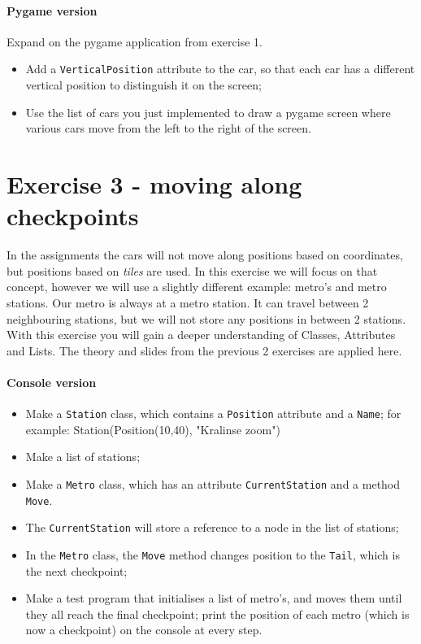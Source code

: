 \documentclass[12pt,a4paper]{article}
\begin{document}
		\paragraph*{Pygame version}
		    Expand on the pygame application from exercise 1.

			\begin{itemize}
				\item Add a \texttt{VerticalPosition} attribute to the car, so that each car has a different vertical position to distinguish it on the screen;
				\item Use the list of cars you just implemented to draw a pygame screen where various cars move from the left to the right of the screen.
			\end{itemize}

	\section{Exercise 3 - moving along checkpoints}
	    In the assignments the cars will not move along positions based on coordinates, but positions based on \textit{tiles} are used.
	    In this exercise we will focus on that concept, however we will use a slightly different example: metro's and metro stations.
	    Our metro is always at a metro station. It can travel between 2 neighbouring stations, but we will not store any positions in between 2 stations.
        With this exercise you will gain a deeper understanding of Classes, Attributes and Lists.
        The theory and slides from the previous 2 exercises are applied here.

		\paragraph*{Console version}
			\begin{itemize}
				\item Make a \texttt{Station} class,
                        which contains a \texttt{Position} attribute and a \texttt{Name};
                        for example: Station(Position(10,40), "Kralinse zoom")
				\item Make a list of stations;
				\item Make a \texttt{Metro} class,
                        which has an attribute \texttt{CurrentStation} and a method \texttt{Move}.
				\item The \texttt{CurrentStation} will store a reference to a node in the list of stations;
				\item In the \texttt{Metro} class, the \texttt{Move} method changes position to the \texttt{Tail}, which is the next checkpoint;
				\item Make a test program that initialises a list of metro's, and moves them until they all reach the final checkpoint; print the position of each metro (which is now a checkpoint) on the console at every step.
			\end{itemize}
\end{document}
